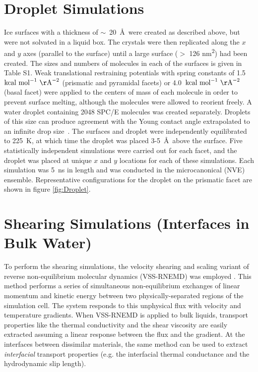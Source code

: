 \section{Droplet Simulations}
Ice surfaces with a thickness of $\sim$~20~\AA\ were created as
described above, but were not solvated in a liquid box. The crystals
were then replicated along the $x$ and $y$ axes (parallel to the
surface) until a large surface ($>$ 126 nm\textsuperscript{2}) had
been created.  The sizes and numbers of molecules in each of the
surfaces is given in Table S1.  Weak translational restraining
potentials with spring constants of 1.5~$\mathrm{kcal\
  mol}^{-1}\mathrm{~\AA}^{-2}$ (prismatic and pyramidal facets) or
4.0~$\mathrm{kcal\ mol}^{-1}\mathrm{~\AA}^{-2}$ (basal facet) were
applied to the centers of mass of each molecule in order to prevent
surface melting, although the molecules were allowed to reorient
freely. A water droplet containing 2048 SPC/E molecules was created
separately. Droplets of this size can produce agreement with the Young
contact angle extrapolated to an infinite drop size~\cite{Daub10}. The
surfaces and droplet were independently equilibrated to 225~K, at
which time the droplet was placed 3-5~\AA\ above the surface.  Five
statistically independent simulations were carried out for each facet,
and the droplet was placed at unique $x$ and $y$ locations for each of
these simulations.  Each simulation was 5~ns in length and was
conducted in the microcanonical (NVE) ensemble.  Representative
configurations for the droplet on the prismatic facet are shown in
figure \ref{fig:Droplet}.

\section{Shearing Simulations (Interfaces in Bulk Water)}
To perform the shearing simulations, the velocity shearing and scaling
variant of reverse non-equilibrium molecular dynamics (VSS-RNEMD) was
employed \cite{Kuang12}. This method performs a series of simultaneous
non-equilibrium exchanges of linear momentum and kinetic energy
between two physically-separated regions of the simulation cell.  The
system responds to this unphysical flux with velocity and temperature
gradients.  When VSS-RNEMD is applied to bulk liquids, transport
properties like the thermal conductivity and the shear viscosity are
easily extracted assuming a linear response between the flux and the
gradient.  At the interfaces between dissimilar materials, the same
method can be used to extract \textit{interfacial} transport
properties (e.g. the interfacial thermal conductance and the
hydrodynamic slip length).

